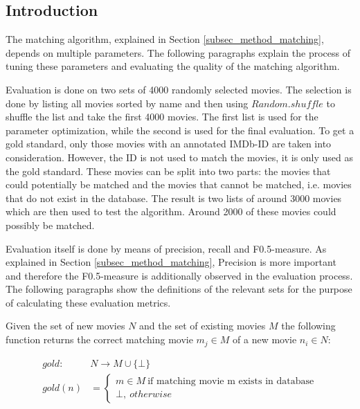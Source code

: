 \label{subsec_evaluation_matching}

\subsection{Introduction}
The matching algorithm, explained in Section \ref{subsec_method_matching}, depends on multiple parameters.
The following paragraphs explain the process of tuning these parameters and evaluating the quality of the matching algorithm.

Evaluation is done on two sets of 4000 randomly selected movies.
The selection is done by listing all movies sorted by name and then using $Random.shuffle$ to shuffle the list and take the first 4000 movies.
The first list is used for the parameter optimization, while the second is used for the final evaluation.
To get a gold standard, only those movies with an annotated IMDb-ID are taken into consideration.
However, the ID is not used to match the movies, it is only used as the gold standard.
These movies can be split into two parts: the movies that could potentially be matched and the movies that cannot be matched, i.e. movies that do not exist in the database.
The result is two lists of around 3000 movies which are then used to test the algorithm.
Around 2000 of these movies could possibly be matched.

Evaluation itself is done by means of precision, recall and F0.5-measure.
As explained in Section \ref{subsec_method_matching}, Precision is more important and therefore the F0.5-measure is additionally observed in the evaluation process.
The following paragraphs show the definitions of the relevant sets for the purpose of calculating these evaluation metrics.

Given the set of new movies $N$ and the set of existing movies $M$ the following function returns the correct matching movie $m_{j} \in M$ of a new movie $n_{i} \in N$:

\begin{align}
	gold: ~&N \rightarrow M \cup \{\bot\} \\
	gold(n) &=
		\begin{cases}
		m \in M ~\text{if matching movie m exists in database}  \\
		\bot,~otherwise
		\end{cases}
\end{align}

